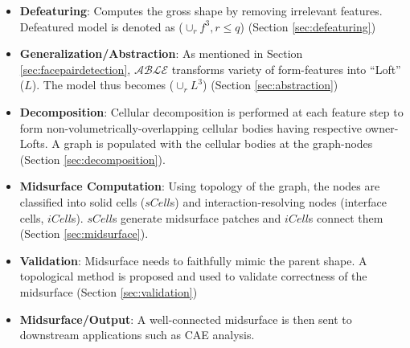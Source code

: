 
%
\begin{itemize}[noitemsep,topsep=2pt,parsep=2pt,partopsep=2pt,leftmargin=*]
\item \textbf{Defeaturing}: Computes the gross shape by removing irrelevant features. Defeatured model  is denoted as ($\cup_rf^3, r \leq q$)  (Section \ref{sec:defeaturing}) %

\item \textbf{Generalization/Abstraction}: As mentioned in Section \ref{sec:facepairdetection}, $\mathcal{ABLE}$ transforms variety of form-features into ``Loft'' ($L$). The model thus becomes ($\cup_rL^3$) (Section \ref{sec:abstraction})%

\item \textbf{Decomposition}: Cellular decomposition is performed at each feature step to form non-volumetrically-overlapping cellular bodies having respective owner-Lofts. A graph is populated with the cellular bodies at the graph-nodes (Section \ref{sec:decomposition}).

\item \textbf{Midsurface Computation}: Using topology of the graph, the nodes are classified into solid cells ($sCell$s) and interaction-resolving nodes (interface cells, $iCell$s).  $sCell$s generate midsurface patches and $iCell$s connect them (Section \ref{sec:midsurface}).

\item \textbf{Validation}:  Midsurface needs to faithfully mimic the parent shape. A topological method is proposed and used to validate correctness of the midsurface (Section \ref{sec:validation})%

\item  \textbf{Midsurface/Output}: A well-connected midsurface is then sent to downstream applications such as CAE analysis.  
\end{itemize}

